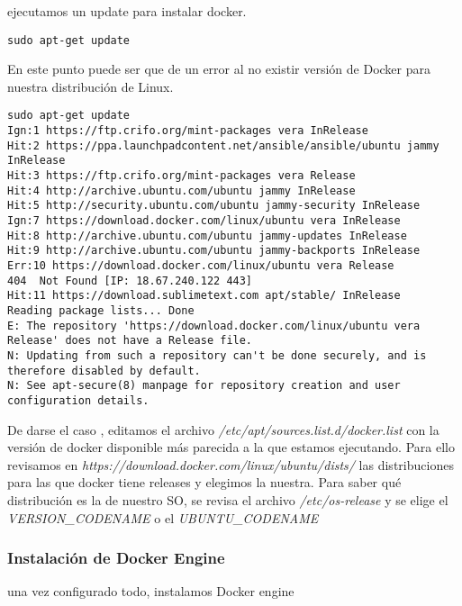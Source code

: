 \documentclass[../main.tex]{subfiles}
\begin{document}
ejecutamos un update para instalar docker.
\begin{lstlisting}
sudo apt-get update
\end{lstlisting}
En este punto puede ser que de un error al no existir versión de Docker para nuestra distribución de Linux.

\begin{lstlisting}
sudo apt-get update 
Ign:1 https://ftp.crifo.org/mint-packages vera InRelease
Hit:2 https://ppa.launchpadcontent.net/ansible/ansible/ubuntu jammy InRelease  
Hit:3 https://ftp.crifo.org/mint-packages vera Release                         
Hit:4 http://archive.ubuntu.com/ubuntu jammy InRelease                         
Hit:5 http://security.ubuntu.com/ubuntu jammy-security InRelease               
Ign:7 https://download.docker.com/linux/ubuntu vera InRelease                  
Hit:8 http://archive.ubuntu.com/ubuntu jammy-updates InRelease                 
Hit:9 http://archive.ubuntu.com/ubuntu jammy-backports InRelease               
Err:10 https://download.docker.com/linux/ubuntu vera Release                   
404  Not Found [IP: 18.67.240.122 443]
Hit:11 https://download.sublimetext.com apt/stable/ InRelease
Reading package lists... Done
E: The repository 'https://download.docker.com/linux/ubuntu vera Release' does not have a Release file.
N: Updating from such a repository can't be done securely, and is therefore disabled by default.
N: See apt-secure(8) manpage for repository creation and user configuration details.
\end{lstlisting}

De darse el caso , editamos el archivo \textit{/etc/apt/sources.list.d/docker.list} con la versión de docker disponible más parecida a la que estamos ejecutando. Para ello revisamos en \textit{https://download.docker.com/linux/ubuntu/dists/} las distribuciones para las que docker tiene releases y elegimos la nuestra. Para saber qué distribución es la de nuestro SO, se revisa el archivo \textit{/etc/os-release} y se elige el \textit{VERSION\_CODENAME} o el 
 \textit{UBUNTU\_CODENAME}

\subsubsection{Instalación de Docker Engine} 
una vez configurado todo, instalamos Docker engine
\end{document}
